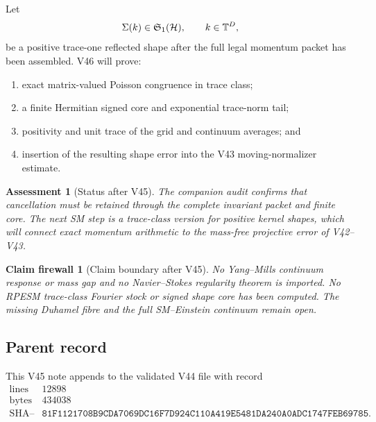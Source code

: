 \documentclass[11pt]{article}
\newtheorem{firewall}[theorem]{Claim firewall}
\newtheorem{assessment}[theorem]{Assessment}
\theoremstyle{remark}
\begin{document}
Let
\[
 \Sigma(k)\in{\mathfrak S}_1({\cal H}),\qquad
 k\in{\mathbb T}^D,
\]
be a positive trace-one reflected shape after the full legal momentum
packet has been assembled.  V46 will prove:
\begin{enumerate}
\item exact matrix-valued Poisson congruence in trace class;
\item a finite Hermitian signed core and exponential trace-norm tail;
\item positivity and unit trace of the grid and continuum averages;
and
\item insertion of the resulting shape error into the V43
moving-normalizer estimate.
\end{enumerate}

\begin{assessment}[Status after V45]
\label{ass:v12v45-status}
The companion audit confirms that cancellation must be retained
through the complete invariant packet and finite core.  The next SM
step is a trace-class version for positive kernel shapes, which will
connect exact momentum arithmetic to the mass-free projective error
of V42--V43.
\end{assessment}

\begin{firewall}[Claim boundary after V45]
\label{fire:v12v45-claim}
No Yang--Mills continuum response or mass gap and no Navier--Stokes
regularity theorem is imported.  No RPESM trace-class Fourier stock
or signed shape core has been computed.  The missing Duhamel fibre
and the full SM--Einstein continuum remain open.
\end{firewall}

\subsection{Parent record}

This V45 note appends to the validated V44 file with record
\[
\begin{array}{c|c}
\text{lines}&12898\\
\text{bytes}&434038\\
\text{SHA--256}&
\texttt{81F1121708B9CDA7069DC16F7D924C110A419E5481DA240A0ADC1747FEB69785}.
\end{array}
\]

\end{document}
